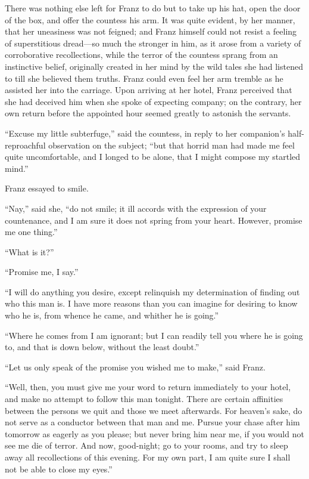There was nothing else left for Franz to do but to take up his hat,
open the door of the box, and offer the countess his arm. It was quite
evident, by her manner, that her uneasiness was not feigned; and Franz
himself could not resist a feeling of superstitious dread—so much the
stronger in him, as it arose from a variety of corroborative
recollections, while the terror of the countess sprang from an
instinctive belief, originally created in her mind by the wild tales
she had listened to till she believed them truths. Franz could even
feel her arm tremble as he assisted her into the carriage. Upon
arriving at her hotel, Franz perceived that she had deceived him when
she spoke of expecting company; on the contrary, her own return before
the appointed hour seemed greatly to astonish the servants.

“Excuse my little subterfuge,” said the countess, in reply to her
companion’s half-reproachful observation on the subject; “but that
horrid man had made me feel quite uncomfortable, and I longed to be
alone, that I might compose my startled mind.”

Franz essayed to smile.

“Nay,” said she, “do not smile; it ill accords with the expression of
your countenance, and I am sure it does not spring from your heart.
However, promise me one thing.”

“What is it?”

“Promise me, I say.”

“I will do anything you desire, except relinquish my determination of
finding out who this man is. I have more reasons than you can imagine
for desiring to know who he is, from whence he came, and whither he is
going.”

“Where he comes from I am ignorant; but I can readily tell you where he
is going to, and that is down below, without the least doubt.”

“Let us only speak of the promise you wished me to make,” said Franz.

“Well, then, you must give me your word to return immediately to your
hotel, and make no attempt to follow this man tonight. There are
certain affinities between the persons we quit and those we meet
afterwards. For heaven’s sake, do not serve as a conductor between that
man and me. Pursue your chase after him tomorrow as eagerly as you
please; but never bring him near me, if you would not see me die of
terror. And now, good-night; go to your rooms, and try to sleep away
all recollections of this evening. For my own part, I am quite sure I
shall not be able to close my eyes.”

